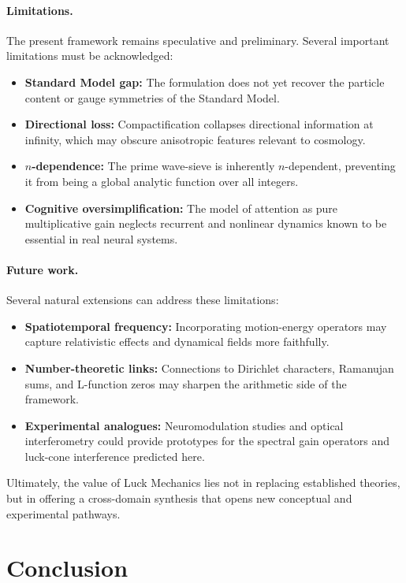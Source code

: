 \documentclass[12pt]{article}
\theoremstyle{plain}
\theoremstyle{definition}
\begin{document}
\paragraph{Limitations.}  
The present framework remains speculative and preliminary. Several important 
limitations must be acknowledged:
\begin{itemize}[leftmargin=1.1em]
  \item \textbf{Standard Model gap:} The formulation does not yet recover the 
  particle content or gauge symmetries of the Standard Model.
  \item \textbf{Directional loss:} Compactification collapses directional 
  information at infinity, which may obscure anisotropic features relevant to 
  cosmology.
  \item \textbf{$n$-dependence:} The prime wave-sieve is inherently $n$-dependent, 
  preventing it from being a global analytic function over all integers.
  \item \textbf{Cognitive oversimplification:} The model of attention as pure 
  multiplicative gain neglects recurrent and nonlinear dynamics known to be 
  essential in real neural systems.
\end{itemize}

\paragraph{Future work.}  
Several natural extensions can address these limitations:
\begin{itemize}[leftmargin=1.1em]
  \item \textbf{Spatiotemporal frequency:} Incorporating motion-energy operators 
  may capture relativistic effects and dynamical fields more faithfully.
  \item \textbf{Number-theoretic links:} Connections to Dirichlet characters, 
  Ramanujan sums, and L-function zeros may sharpen the arithmetic side of the 
  framework.
  \item \textbf{Experimental analogues:} Neuromodulation studies and optical 
  interferometry could provide prototypes for the spectral gain operators and 
  luck-cone interference predicted here.
\end{itemize}
Ultimately, the value of Luck Mechanics lies not in replacing established 
theories, but in offering a cross-domain synthesis that opens new conceptual and 
experimental pathways.

\section{Conclusion}
\end{document}
